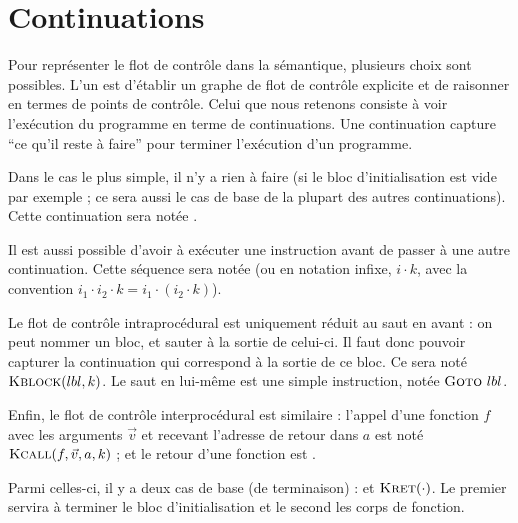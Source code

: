 \section{Continuations}
\label{sec:cont}

Pour représenter le flot de contrôle dans la sémantique, plusieurs choix sont
possibles. L'un est d'établir un graphe de flot de contrôle explicite et de
raisonner en termes de points de contrôle. Celui que nous retenons consiste à
voir l'exécution du programme en terme de continuations. Une continuation
capture ``ce qu'il reste à faire'' pour terminer l'exécution d'un programme.

Dans le cas le plus simple, il n'y a rien à faire (si le bloc d'initialisation
est vide par exemple ; ce sera aussi le cas de base de la plupart des autres
continuations). Cette continuation sera notée \kPass.

Il est aussi possible d'avoir à exécuter une instruction avant de passer à une
autre continuation. Cette séquence sera notée  (ou en notation
infixe, $i \cdot k$, avec la convention $i_1 \cdot i_2 \cdot k = i_1 \cdot (i_2
\cdot k) $).

Le flot de contrôle intraprocédural est uniquement réduit au saut en avant : on
peut nommer un bloc, et sauter à la sortie de celui-ci. Il faut donc pouvoir
capturer la continuation qui correspond à la sortie de ce bloc. Ce sera noté
$\textsc{Kblock}(lbl, k)$. Le saut en lui-même est une simple instruction, notée
$\textsc{Goto}~lbl$.

Enfin, le flot de contrôle interprocédural est similaire : l'appel d'une
fonction $f$ avec les arguments $\vec{v}$ et recevant l'adresse de retour dans
$a$ est noté $\textsc{Kcall}(f, \vec{v}, a, k)$ ; et le retour d'une fonction est
.


Parmi celles-ci, il y a deux cas de base (de terminaison) : \kPass et
$\textsc{Kret}(\cdot)$. Le premier servira à terminer le bloc d'initialisation et le
second les corps de fonction.

